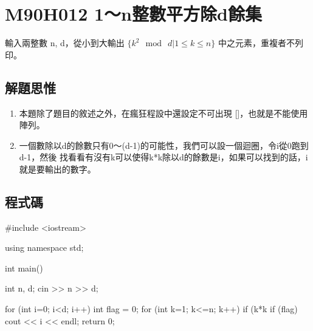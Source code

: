 \section{M90H012 1～n整數平方除d餘集}
輸入兩整數 n, d，從小到大輸出 $\{k^2 \mod\ d| 1\le k\le n\}$ 中之元素，重複者不列印。
\subsection{解題思惟}
\begin{enumerate}
	\item 本題除了題目的敘述之外，在瘋狂程設中還設定不可出現 [{}]，也就是不能使用陣列。
	\item 一個數除以d的餘數只有0～(d-1)的可能性，我們可以設一個迴圈，令i從0跑到d-1，然後
	找看看有沒有k可以使得k*k除以d的餘數是i，如果可以找到的話，i就是要輸出的數字。
\end{enumerate}
\subsection{程式碼}
\begin{cppcode}
#include <iostream>

using namespace std;

int main()
{
	int n, d;
	cin >> n >> d;
	
	for (int i=0; i<d; i++) {
		int flag = 0;
		for (int k=1; k<=n; k++) {
			if (k*k%
		}
		if (flag) cout << i << endl;
	}
	return 0;
}
\end{cppcode}

